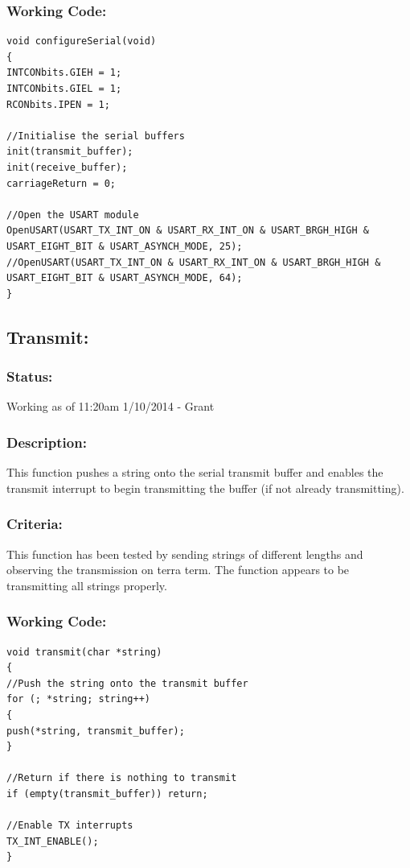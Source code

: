 \documentclass[]{report}
\begin{document}
\subsubsection{Working Code:}
\begin{lstlisting}
void configureSerial(void)
{
INTCONbits.GIEH = 1;
INTCONbits.GIEL = 1;
RCONbits.IPEN = 1;

//Initialise the serial buffers
init(transmit_buffer);
init(receive_buffer);
carriageReturn = 0;

//Open the USART module
OpenUSART(USART_TX_INT_ON & USART_RX_INT_ON & USART_BRGH_HIGH & USART_EIGHT_BIT & USART_ASYNCH_MODE, 25);
//OpenUSART(USART_TX_INT_ON & USART_RX_INT_ON & USART_BRGH_HIGH & USART_EIGHT_BIT & USART_ASYNCH_MODE, 64);
}
\end{lstlisting}

\subsection{Transmit:}
\subsubsection{Status:}
Working as of 11:20am 1/10/2014 - Grant

\subsubsection{Description:}
This function pushes a string onto the serial transmit buffer and enables the transmit interrupt to begin transmitting the buffer (if not already transmitting).

\subsubsection{Criteria:}
This function has been tested by sending strings of different lengths and observing the transmission on terra term. The function appears to be transmitting all strings properly.

\subsubsection{Working Code:}
\begin{lstlisting}
void transmit(char *string)
{
//Push the string onto the transmit buffer
for (; *string; string++)
{
push(*string, transmit_buffer);
}

//Return if there is nothing to transmit
if (empty(transmit_buffer)) return;

//Enable TX interrupts
TX_INT_ENABLE();
}
\end{lstlisting}
\end{document}
